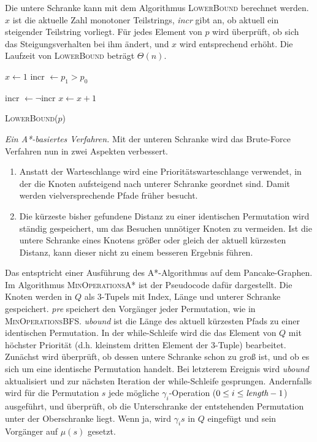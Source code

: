 \documentclass[a4paper, 10pt, ngerman]{article}
\begin{document}
Die untere Schranke kann mit dem Algorithmus \textsc{LowerBound} berechnet werden. $x$ ist die aktuelle Zahl monotoner Teilstrings, \emph{incr} gibt an, ob aktuell ein steigender Teilstring vorliegt. Für jedes Element von $p$ wird überprüft, ob sich das Steigungsverhalten bei ihm ändert, und $x$ wird entsprechend erhöht. Die Laufzeit von \textsc{LowerBound} beträgt $\Theta(n)$.

\begin{algorithm}
    {
         \;
    }

    $x \gets 1$ \;
    incr $\gets p_1 > p_0$ \;

    {
        {
            incr $\gets \neg$incr \;
            $x \gets x + 1$ \;
        }
    }

     \;

    \caption{\textsc{LowerBound}($p$)}
\end{algorithm}

\emph{{Ein A*-basiertes Verfahren.}} Mit der unteren Schranke wird das Brute-Force Verfahren nun in zwei Aspekten verbessert.

\begin{enumerate}
    \item Anstatt der Warteschlange wird eine Prioritätswarteschlange verwendet, in der die Knoten aufsteigend nach unterer Schranke geordnet sind. Damit werden vielversprechende Pfade früher besucht.
    \item Die kürzeste bisher gefundene Distanz zu einer identischen Permutation wird ständig gespeichert, um das Besuchen unnötiger Knoten zu vermeiden. Ist die untere Schranke eines Knotens größer oder gleich der aktuell kürzesten Distanz, kann dieser nicht zu einem besseren Ergebnis führen.
\end{enumerate}

Das entsptricht einer Ausführung des A*-Algorithmus auf dem Pancake-Graphen. Im Algorithmus \textsc{MinOperationsA*} ist der Pseudocode dafür dargestellt. Die Knoten werden in $Q$ als 3-Tupels mit Index, Länge und unterer Schranke gespeichert. \emph{pre} speichert den Vorgänger jeder Permutation, wie in \textsc{MinOperationsBFS}. \emph{ubound} ist die Länge des aktuell kürzesten Pfads zu einer identischen Permutation. In der while-Schleife wird die das Element von $Q$ mit höchster Priorität (d.h. kleinstem dritten Element der 3-Tuple) bearbeitet. Zunächst wird überprüft, ob dessen untere Schranke schon zu groß ist, und ob es sich um eine identische Permutation handelt. Bei letzterem Ereignis wird \emph{ubound} aktualisiert und zur nächsten Iteration der while-Schleife gesprungen. Andernfalls wird für die Permutation $s$ jede mögliche $\gamma_i$-Operation ($0 \le i \le \emph{length} - 1$) ausgeführt, und überprüft, ob die Unterschranke der entstehenden Permutation unter der Oberschranke liegt. Wenn ja, wird $\gamma_i s$ in $Q$ eingefügt und sein Vorgänger auf $\mu(s)$ gesetzt.
\end{document}
